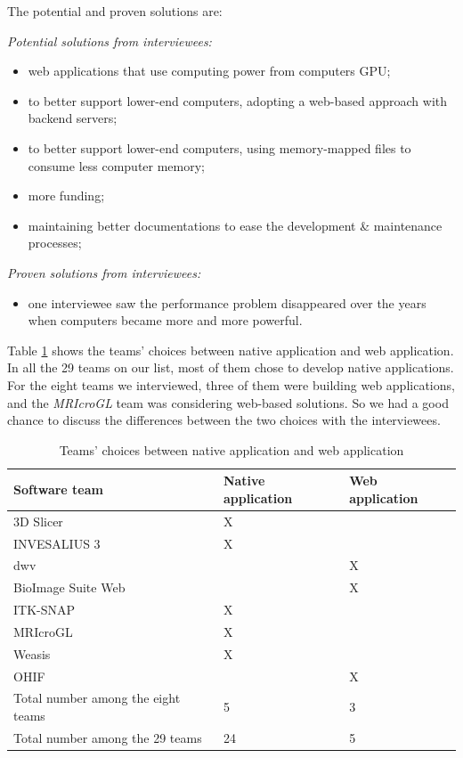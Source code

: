\documentclass[preprint,12pt,authoryear]{elsarticle}
\begin{document}
The potential and proven solutions are:

\noindent\textit{Potential solutions from interviewees:}

\begin{itemize}
\item web applications that use computing power from computers GPU;
\item to better support lower-end computers, adopting a web-based approach with backend servers;
\item to better support lower-end computers, using memory-mapped files to
consume less computer memory;
\item more funding;
\item maintaining better documentations to ease the development \& maintenance
processes;
\end{itemize}

\noindent\textit{Proven solutions from interviewees:}

\begin{itemize}
\item one interviewee saw the performance problem disappeared over the years
when computers became more and more powerful. 
\end{itemize}

Table \ref{tab_native_vs_web} shows the teams' choices between native
application and web application. In all the 29 teams on our list, most of them
chose to develop native applications. For the eight teams we interviewed, three
of them were building web applications, and the \textit{MRIcroGL} team was
considering web-based solutions. So we had a good chance to discuss the
differences between the two choices with the interviewees.

\begin{table}[ht]
\centering
\begin{tabular}{lll}
\hline
Software team & Native application & Web application \\ \hline
3D Slicer & X & \\
INVESALIUS 3 & X & \\
dwv & & X \\
BioImage Suite Web & & X \\
ITK-SNAP & X & \\
MRIcroGL & X & \\
Weasis & X & \\
OHIF & & X \\ \hdashline
Total number among the eight teams & 5 & 3 \\
Total number among the 29 teams & 24 & 5 \\ \hline
\end{tabular}
\caption{\label{tab_native_vs_web}Teams' choices between native application and
web application}
\end{table}
\end{document}
